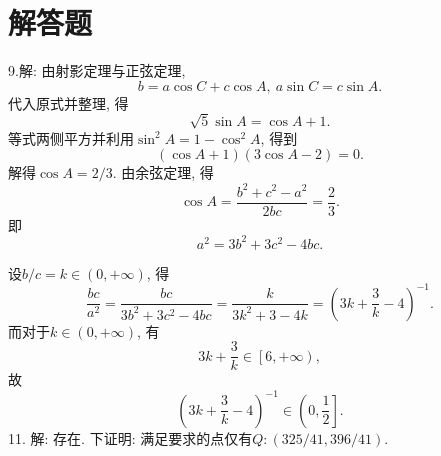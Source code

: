 \documentclass{article}
\begin{document}
	\section{解答题}
	9.解: 由射影定理与正弦定理, 
	\[b=a\cos{C}+c\cos{A},\ a\sin{C}=c\sin{A}.\]
	代入原式并整理, 得
	\[\sqrt{5}\sin{A}=\cos{A}+1.\]
	等式两侧平方并利用$\sin^2{A}=1-\cos^2{A}$, 得到
	\[(\cos{A}+1)(3\cos{A}-2)=0.\]
	解得$\cos{A}=2/3.$ 由余弦定理, 得
	\[\cos{A}=\frac{b^2+c^2-a^2}{2bc}=\frac{2}{3}.\]
	即
	\[a^2=3b^2+3c^2-4bc.\]\par
	设$b/c=k\in(0,+\infty)$, 得
	\[\frac{bc}{a^2}=\frac{bc}{3b^2+3c^2-4bc}=\frac{k}{3k^2+3-4k}=\left(3k+\frac{3}{k}-4\right)^{-1}.\]
	而对于$k\in(0,+\infty)$, 有
	\[3k+\frac{3}{k}\in\left[6,+\infty\right),\]
	故
	\[\left(3k+\frac{3}{k}-4\right)^{-1}\in\left(0,\frac{1}{2}\right].\]
	11. 解: 存在. 下证明: 满足要求的点仅有$Q:(325/41,396/41)$.
\end{document}
